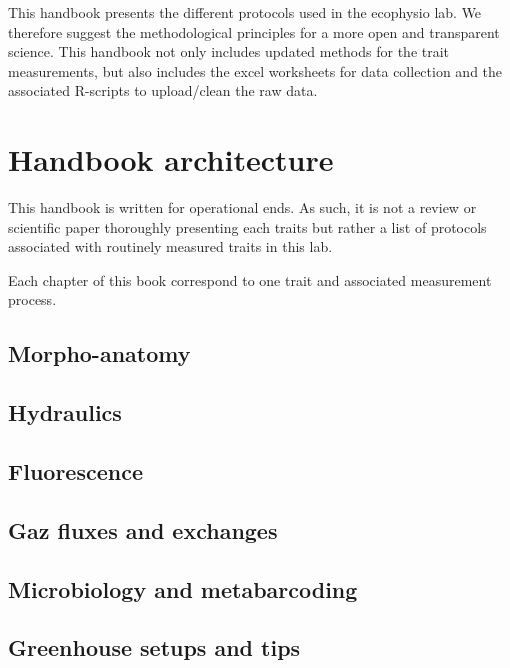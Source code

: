 \documentclass[
  12pt,
  american,
  a4paper,
  extrafontsizes,onecolumn,openright
  ]{memoir}
\begin{document}
This handbook presents the different protocols used in the ecophysio lab. We therefore suggest the methodological principles for a more open and transparent science. This handbook not only includes updated methods for the trait measurements, but also includes the excel worksheets for data collection and the associated R-scripts to upload/clean the raw data.

\hypertarget{handbook-architecture}{%
\chapter{Handbook architecture}\label{handbook-architecture}}

This handbook is written for operational ends. As such, it is not a review or scientific paper thoroughly presenting each traits but rather a list of protocols associated with routinely measured traits in this lab.

Each chapter of this book correspond to one trait and associated measurement process.

\hypertarget{morpho-anatomy}{%
\section{Morpho-anatomy}\label{morpho-anatomy}}

\hypertarget{hydraulics}{%
\section{Hydraulics}\label{hydraulics}}

\hypertarget{fluorescence}{%
\section{Fluorescence}\label{fluorescence}}

\hypertarget{gaz-fluxes-and-exchanges}{%
\section{Gaz fluxes and exchanges}\label{gaz-fluxes-and-exchanges}}

\hypertarget{microbiology-and-metabarcoding}{%
\section{Microbiology and metabarcoding}\label{microbiology-and-metabarcoding}}

\hypertarget{greenhouse-setups-and-tips}{%
\section{Greenhouse setups and tips}\label{greenhouse-setups-and-tips}}
\end{document}
